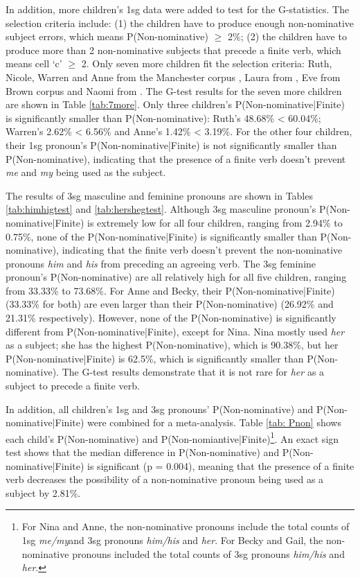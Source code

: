 In addition, more children's 1sg data were added to test for the G-statistics. The selection criteria include: (1) the children have to produce enough non-nominative subject errors, which means P(Non-nominative) $\geq$ 2\%; (2) the children have to produce more than 2 non-nominative subjects that precede a finite verb, which means cell `c' $\geq$ 2. Only seven more children fit the selection criteria: Ruth, Nicole, Warren and Anne from the Manchester corpus \citep{theakston2001}, Laura from \cite{braunwald1971mother}, Eve from Brown corpus \citep{brown1973first} and Naomi from \cite{sachs1983talking}. The G-test results for the seven more children are shown in Table \ref{tab:7more}. Only three children's P(Non-nominative|Finite) is significantly smaller than P(Non-nominative): Ruth's 48.68\% < 60.04\%; Warren's 2.62\% < 6.56\% and Anne's 1.42\% < 3.19\%. For the other four children, their 1sg pronoun's  P(Non-nominative|Finite) is not significantly smaller than P(Non-nominative), indicating that the presence of a finite verb doesn't prevent \textit{me} and \textit{my} being used as the subject.  

The results of 3sg masculine and feminine pronouns are shown in Tables \ref{tab:himhigtest} and \ref{tab:hershegtest}. Although 3sg masculine pronoun's P(Non-nominative|Finite) is extremely low for all four children, ranging from 2.94\% to 0.75\%, none of the P(Non-nominative|Finite) is significantly smaller than P(Non-nominative), indicating that the finite verb doesn't prevent the non-nominative pronouns \textit{him} and \textit{his} from preceding an agreeing verb. The 3sg feminine pronoun's P(Non-nominative) are all relatively high for all five children, ranging from 33.33\% to 73.68\%. For Anne and Becky, their P(Non-nominative|Finite) (33.33\% for both) are even larger than their P(Non-nominative) (26.92\% and 21.31\% respectively). However, none of the P(Non-nominative) is significantly different from P(Non-nominative|Finite), except for Nina. Nina mostly used \textit{her} as a subject; she has the highest P(Non-nominative), which is 90.38\%, but her P(Non-nominative|Finite) is 62.5\%, which is significantly smaller than P(Non-nominative). The G-test results demonstrate that it is not rare for \textit{her} as a subject to precede a finite verb.

In addition, all children's 1sg and 3sg pronouns' P(Non-nominative) and P(Non-nominative|Finite) were combined for a meta-analysis. Table \ref{tab: Pnon} shows each child's P(Non-nominative) and P(Non-nomiantive|Finite)\footnote{For Nina and Anne, the non-nominative pronouns include the total counts of 1sg \textit{me/my}and 3sg pronouns \textit{him/his} and \textit{her}. For Becky and Gail, the non-nominative pronouns included the total counts of 3sg pronouns \textit{him/his} and \textit{her}.}. An exact sign test shows that the median difference in P(Non-nominative) and P(Non-nominative|Finite) is significant (p = 0.004), meaning that the presence of a finite verb decreases the possibility of a non-nominative pronoun being used as a subject by 2.81\%. 

